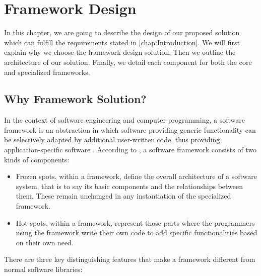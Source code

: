 \chapter{Framework Design}
\label{chap:fw-design}


In this chapter, we are going to describe the design of our proposed solution
which can fulfill the requirements stated in \autoref{chap:Introduction}.
We will first explain why we choose the framework design solution. Then we outline the 
architecture of our solution. Finally, we detail each component for both the 
core and specialized frameworks.

\section{Why Framework Solution?}
\label{sec:fw-design-why}

In the context of software engineering and computer programming, a software
framework is an abstraction in which software providing generic functionality
can be selectively adapted by additional user-written code, thus providing
application-specific software \cite{wikipedia-software-framework}.
According to \cite{software-framework-def}, a software framework consists of
two kinds of components:

\begin{itemize}
    \item Frozen spots, within a framework, define the overall
    architecture of a software system, that is to say its basic components
    and the relationships between them. These remain unchanged in any
    instantiation of the specialized framework.

    \item Hot spots, within a framework, represent those parts where the
    programmers using the framework write their own code to add specific
    functionalities based on their own need.
\end{itemize}

There are three key distinguishing features that make a framework different from
normal software libraries:

